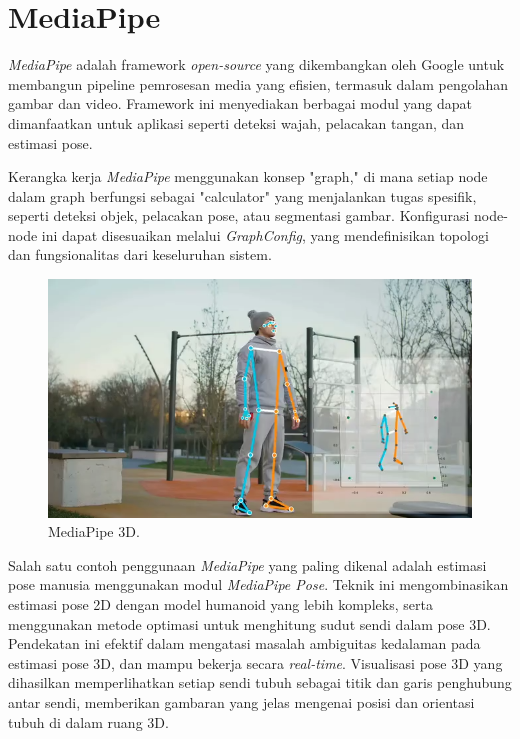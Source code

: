 \section{MediaPipe}
\label{sec:MediaPipe}

\emph{MediaPipe} adalah framework \emph{open-source} yang dikembangkan oleh Google untuk membangun pipeline pemrosesan media yang efisien, termasuk dalam pengolahan gambar dan video. Framework ini menyediakan berbagai modul yang dapat dimanfaatkan untuk aplikasi seperti deteksi wajah, pelacakan tangan, dan estimasi pose.

Kerangka kerja \emph{MediaPipe} menggunakan konsep "graph," di mana setiap node dalam graph berfungsi sebagai "calculator" yang menjalankan tugas spesifik, seperti deteksi objek, pelacakan pose, atau segmentasi gambar. Konfigurasi node-node ini dapat disesuaikan melalui \emph{GraphConfig}, yang mendefinisikan topologi dan fungsionalitas dari keseluruhan sistem.

\begin{figure}[H]
  \centering
  \includegraphics[scale=0.5]{gambar/MediaPipe3D.png}
  \caption{MediaPipe 3D.}
  \label{fig:MediaPipe3D}
\end{figure}

Salah satu contoh penggunaan \emph{MediaPipe} yang paling dikenal adalah estimasi pose manusia menggunakan modul \emph{MediaPipe Pose}. Teknik ini mengombinasikan estimasi pose 2D dengan model humanoid yang lebih kompleks, serta menggunakan metode optimasi untuk menghitung sudut sendi dalam pose 3D. Pendekatan ini efektif dalam mengatasi masalah ambiguitas kedalaman pada estimasi pose 3D, dan mampu bekerja secara \emph{real-time}. Visualisasi pose 3D yang dihasilkan memperlihatkan setiap sendi tubuh sebagai titik dan garis penghubung antar sendi, memberikan gambaran yang jelas mengenai posisi dan orientasi tubuh di dalam ruang 3D.

